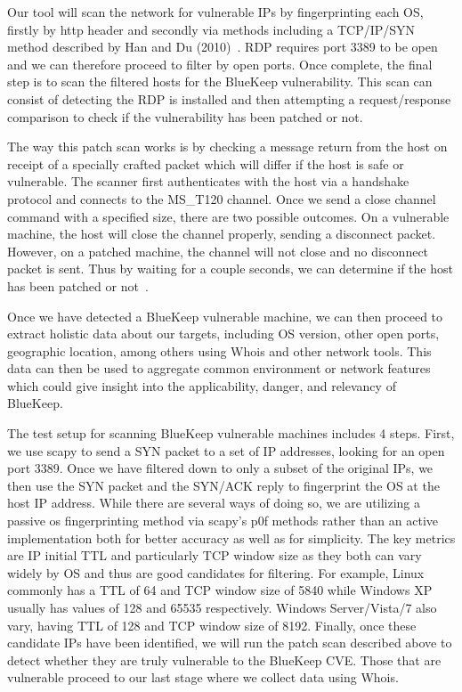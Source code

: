 Our tool will scan the network for vulnerable IPs by fingerprinting each OS, firstly by http header and secondly via methods including a TCP/IP/SYN method described by Han and Du (2010)~\cite{han_du_2010}. RDP requires port 3389 to be open and we can therefore proceed to filter by open ports. Once complete, the final step is to scan the filtered hosts for the BlueKeep vulnerability. This scan can consist of detecting the RDP is installed and then attempting a request/response comparison to check if the vulnerability has been patched or not.

The way this patch scan works is by checking a message return from the host on receipt of a specially crafted packet which will differ if the host is safe or vulnerable. The scanner first authenticates with the host via a handshake protocol and connects to the MS\_T120 channel. Once we send a close channel command with a specified size, there are two possible outcomes. On a vulnerable machine, the host will close the channel properly, sending a disconnect packet. However, on a patched machine, the channel will not close and no disconnect packet is sent. Thus by waiting for a couple seconds, we can determine if the host has been patched or not~\cite{dillon_2019}.

Once we have detected a BlueKeep vulnerable machine, we can then proceed to extract holistic data about our targets, including OS version, other open ports, geographic location, among others using Whois and other network tools. This data can then be used to aggregate common environment or network features which could give insight into the applicability, danger, and relevancy of BlueKeep.

The test setup for scanning BlueKeep vulnerable machines includes 4 steps. First, we use scapy to send a SYN packet to a set of IP addresses, looking for an open port 3389. Once we have filtered down to only a subset of the original IPs, we then use the SYN packet and the SYN/ACK reply to fingerprint the OS at the host IP address. While there are several ways of doing so, we are utilizing a passive os fingerprinting method via scapy's p0f methods rather than an active implementation both for better accuracy as well as for simplicity. The key metrics are IP initial TTL and particularly TCP window size as they both can vary widely by OS and thus are good candidates for filtering. For example, Linux commonly has a TTL of 64 and TCP window size of 5840 while Windows XP usually has values of 128 and 65535 respectively. Windows Server/Vista/7 also vary, having TTL of 128 and TCP window size of 8192. Finally, once these candidate IPs have been identified, we will run the patch scan described above to detect whether they are truly vulnerable to the BlueKeep CVE. Those that are vulnerable proceed to our last stage where we collect data using Whois.